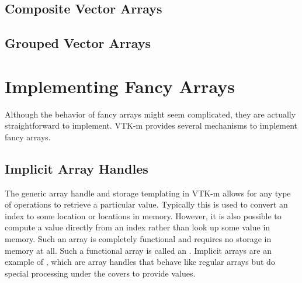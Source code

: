 \subsection{Composite Vector Arrays}
\label{sec:CompositeVectorArrays}




\subsection{Grouped Vector Arrays}
\label{sec:GroupedVectorArrays}





\section{Implementing Fancy Arrays}
\label{sec:ImplementingFancyArrays}

Although the behavior of fancy arrays might seem complicated, they are
actually straightforward to implement. VTK-m provides several mechanisms to
implement fancy arrays.

\subsection{Implicit Array Handles}


The generic array handle and storage templating in VTK-m allows for
any type of operations to retrieve a particular value. Typically this is
used to convert an index to some location or locations in memory. However,
it is also possible to compute a value directly from an index rather than
look up some value in memory. Such an array is completely functional and
requires no storage in memory at all. Such a functional array is called an
. Implicit arrays are an example of
, which are array handles that behave like
regular arrays but do special processing under the covers to provide
values.

